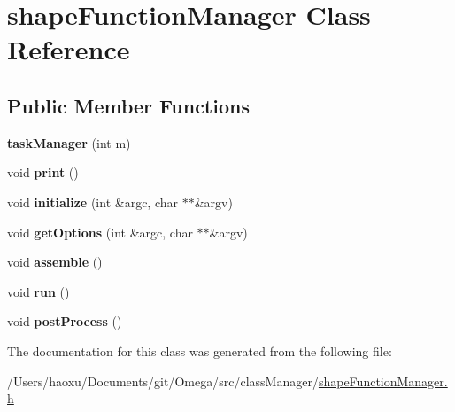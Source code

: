 \hypertarget{classshape_function_manager}{}\section{shape\+Function\+Manager Class Reference}
\label{classshape_function_manager}
\subsection*{Public Member Functions}
\begin{DoxyCompactItemize}
\item 
\mbox{\label{classshape_function_manager_aef252ed3c69384b9514f3811932ab300}} 
{\bfseries task\+Manager} (int m)
\item 
\mbox{\label{classshape_function_manager_a982eb6713dff44a8c4ea8f2d0155dfe2}} 
void {\bfseries print} ()
\item 
\mbox{\label{classshape_function_manager_a83b26dfe844b7455315c491dd74e9fab}} 
void {\bfseries initialize} (int \&argc, char $\ast$$\ast$\&argv)
\item 
\mbox{\label{classshape_function_manager_a9d397b26d4c7f99030ef19fef94f8886}} 
void {\bfseries get\+Options} (int \&argc, char $\ast$$\ast$\&argv)
\item 
\mbox{\label{classshape_function_manager_a65d997f3ebc4e2706b99aed5d70ab434}} 
void {\bfseries assemble} ()
\item 
\mbox{\label{classshape_function_manager_aaab5ceef6d0072b561080a96829c2bda}} 
void {\bfseries run} ()
\item 
\mbox{\label{classshape_function_manager_ae8c6e178effa295a276d6dd8503b6753}} 
void {\bfseries post\+Process} ()
\end{DoxyCompactItemize}


The documentation for this class was generated from the following file\+:\begin{DoxyCompactItemize}
\item 
/\+Users/haoxu/\+Documents/git/\+Omega/src/class\+Manager/\hyperlink{shape_function_manager_8h}{shape\+Function\+Manager.\+h}\end{DoxyCompactItemize}
